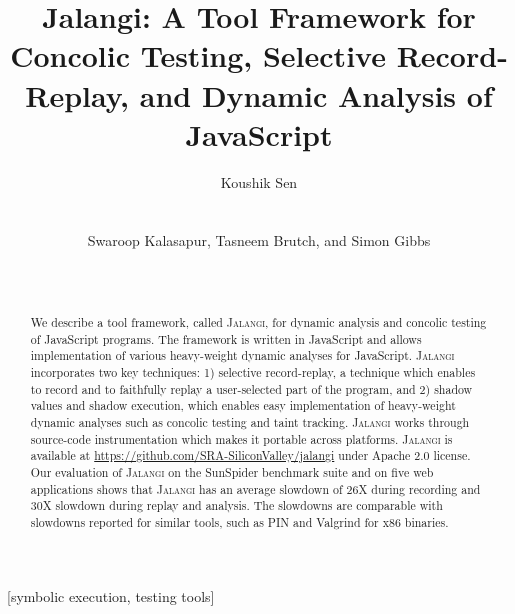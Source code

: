 \documentclass{sig-alternate}
\def\jalangi{\textsc{Jalangi}}
\begin{document}

\title{Jalangi: A Tool Framework for Concolic Testing, Selective
  Record-Replay, and Dynamic Analysis of JavaScript}

\author{
\alignauthor
Koushik Sen\\
      \\
      \\
\alignauthor
Swaroop Kalasapur, Tasneem Brutch,  and Simon Gibbs\\
\\
\\
}
\maketitle
\sloppy

\begin{abstract}
  We describe a tool framework, called \jalangi{}, for dynamic
  analysis and concolic testing of JavaScript programs.  The framework
  is written in JavaScript and allows implementation of various
  heavy-weight dynamic analyses for JavaScript. \jalangi{}
  incorporates two key techniques: 1) selective record-replay, a
  technique which enables to record and to faithfully replay a
  user-selected part of the program, and 2) shadow values and shadow
  execution, which enables easy implementation of heavy-weight dynamic
  analyses such as concolic testing and taint tracking.  \jalangi{}
  works through source-code instrumentation which makes it portable
  across platforms.  \jalangi{} is available at
  \url{https://github.com/SRA-SiliconValley/jalangi} under Apache 2.0
  license.  Our evaluation of \jalangi{} on the SunSpider benchmark
  suite and on five web applications shows that \jalangi{} has an
  average slowdown of 26X during recording and 30X slowdown during
  replay and analysis.  The slowdowns are comparable with slowdowns
  reported for similar tools, such as PIN and Valgrind for x86
  binaries.
\end{abstract}


\vspace*{-1ex}
[symbolic
execution, testing tools]
\vspace*{-2ex}
\vspace*{-2ex}
\end{document}
